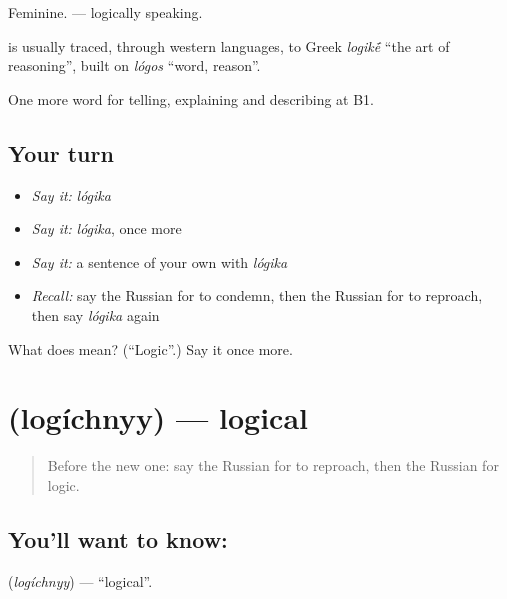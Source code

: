 Feminine. \emph{ } — logically speaking.

\begin{cousinweb}
\textbf{} is usually traced, through western languages, to Greek \emph{logik\'{\={e}}} \textquotedblleft{}the art of reasoning\textquotedblright{}, built on \emph{lógos} \textquotedblleft{}word, reason\textquotedblright{}.
\end{cousinweb}

\begin{grammarlens}[title={What you've built}]
One more word for telling, explaining and describing at B1.
\end{grammarlens}

\subsection*{Your turn}
\begin{itemize}
\raggedright
  \item \emph{Say it:} \emph{lógika}
  \item \emph{Say it:} \emph{lógika}, once more
  \item \emph{Say it:} a sentence of your own with \emph{lógika}
  \item \emph{Recall:} say the Russian for to condemn, then the Russian for to reproach, then say \emph{lógika} again
\end{itemize}

\begin{tcolorbox}[breakable,colback=teal!4,colframe=teal!35!black,title={Before you move on}]
What does  mean? (\textquotedblleft{}Logic\textquotedblright{}.) Say it once more.
\end{tcolorbox}
\section[\texorpdfstring{\ru{логичный} (logíchnyy)}{логичный (logíchnyy)}]{ (logíchnyy) — logical}

\label{lesson:RU-C344-logichnyy}



\begin{quote}
Before the new one: say the Russian for to reproach, then the Russian for logic.
\end{quote}

\subsection*{You'll want to know: }
\textbf{} (\emph{logíchnyy}) — \textquotedblleft{}logical\textquotedblright{}.

